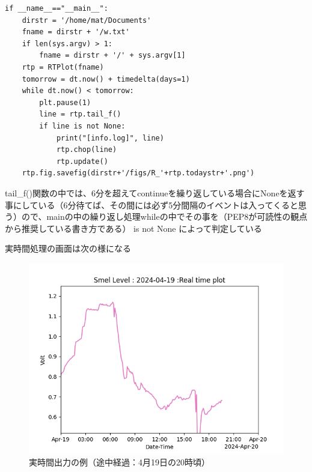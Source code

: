 \documentclass[12pt,a4paper,uplatex]{jsarticle}
\begin{document}
\begin{breakbox}
\begin{verbatim}
if __name__=="__main__":
    dirstr = '/home/mat/Documents'
    fname = dirstr + '/w.txt'
    if len(sys.argv) > 1:
        fname = dirstr + '/' + sys.argv[1]
    rtp = RTPlot(fname)
    tomorrow = dt.now() + timedelta(days=1)
    while dt.now() < tomorrow:
        plt.pause(1)
        line = rtp.tail_f()
        if line is not None:
            print("[info.log]", line)
            rtp.chop(line)
            rtp.update()
    rtp.fig.savefig(dirstr+'/figs/R_'+rtp.todaystr+'.png')
	\end{verbatim}
\end{breakbox}

tail\_f()関数の中では、6分を超えてcontinueを繰り返している場合にNoneを返す事にしている（6分待てば、その間には必ず5分間隔のイベントは入ってくると思う）ので、mainの中の繰り返し処理whileの中でその事を（PEP8が可読性の観点から推奨している書き方である） is not None によって判定している

実時間処理の画面は次の様になる

\begin{figure}[htbp]
	\begin{minipage}[b]{1.0\linewidth}
		\centering
		\includegraphics[keepaspectratio, scale=0.8]{figs/png/Figure_1.png}
		\caption{実時間出力の例（途中経過：4月19日の20時頃）}
	\end{minipage}
\end{figure}
\end{document}
